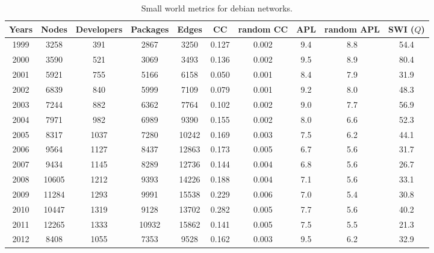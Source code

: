 \begin{table}
\begin{center}
\begin{tabular}{|c|c|c|c|c|c|c|c|c|c|}
\hline
Years&Nodes&Developers&Packages&Edges&CC&random CC&APL&random APL&SWI ($Q$)\\
\hline
1999&3258&391&2867&3250&0.127&0.002&9.4&8.8&54.4\\
2000&3590&521&3069&3493&0.136&0.002&9.5&8.9&80.4\\
2001&5921&755&5166&6158&0.050&0.001&8.4&7.9&31.9\\
2002&6839&840&5999&7109&0.079&0.001&9.2&8.0&48.3\\
2003&7244&882&6362&7764&0.102&0.002&9.0&7.7&56.9\\
2004&7971&982&6989&9390&0.155&0.002&8.0&6.6&52.3\\
2005&8317&1037&7280&10242&0.169&0.003&7.5&6.2&44.1\\
2006&9564&1127&8437&12863&0.173&0.005&6.7&5.6&31.7\\
2007&9434&1145&8289&12736&0.144&0.004&6.8&5.6&26.7\\
2008&10605&1212&9393&14226&0.188&0.004&7.1&5.6&33.1\\
2009&11284&1293&9991&15538&0.229&0.006&7.0&5.4&30.8\\
2010&10447&1319&9128&13702&0.282&0.005&7.7&5.6&40.2\\
2011&12265&1333&10932&15862&0.141&0.005&7.5&5.5&21.3\\
2012&8408&1055&7353&9528&0.162&0.003&9.5&6.2&32.9\\
\hline
\end{tabular}
\caption{Small world metrics for debian networks.}
\label{swi_debian}
\end{center}
\end{table}

